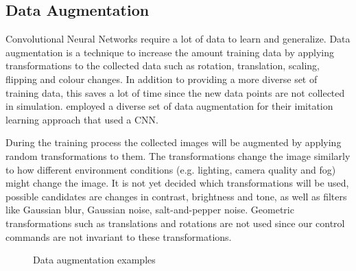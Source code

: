 

\subsection*{Data Augmentation}

Convolutional Neural Networks require a lot of data to learn and generalize. Data augmentation is a technique to increase the amount training data by applying transformations to the collected data such as rotation, translation, scaling, flipping and colour changes. In addition to providing a more diverse set of training data, this saves a lot of time since the new data points are not collected in simulation. \autocite{conditional_imitation_learning} employed a diverse set of data augmentation for their imitation learning approach that used a CNN.

During the training process the collected images will be augmented by applying random transformations to them. The transformations change the image similarly to how different environment conditions (e.g. lighting, camera quality and fog) might change the image. It is not yet decided which transformations will be used, possible candidates are changes in contrast, brightness and tone, as well as filters like Gaussian blur, Gaussian noise, salt-and-pepper noise.
Geometric transformations such as translations and rotations are not used since our control commands are not invariant to these transformations.

\begin{figure}
     \centering
     \caption{Data augmentation examples}
     \label{fig:data_augmentation}
\end{figure}

